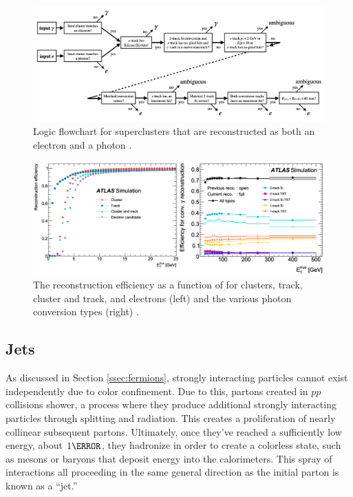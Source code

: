 \begin{figure}[h]
    \centering
    \includegraphics[width=1\textwidth]{chapters/chapter3_eventreco/images/egamma-amb.png}

    \caption[Logic flowchart for superclusters that are reconstructed as both an electron and a photon]{Logic flowchart for superclusters that are reconstructed as both an electron and a photon \cite{photon-electron-perf}.}
    \label{fig:ambiguity-logic}
\end{figure}



\begin{figure}[h]
    \centering
    \includegraphics[width=1\textwidth]{chapters/chapter3_eventreco/images/combined-efficiency.png}

    \caption[The reconstruction efficiency as a function of \et for electrons and converted photons]{The reconstruction efficiency as a function of \et for clusters, track, cluster and track, and electrons (left) and the various photon conversion types (right) \cite{photon-electron-perf}.}
    \label{fig:reco-eff}
\end{figure}


\subsection{Jets} \label{ssec:jet-reco}
As discussed in Section \ref{ssec:fermions}, strongly interacting particles cannot exist independently due to color confinement. Due to this, partons created in $pp$ collisions shower, a process where they produce additional strongly interacting particles through splitting and radiation. This creates a proliferation of nearly collinear subsequent partons. Ultimately, once they've reached a sufficiently low energy, about $\unit{1}{\GeV}$, they hadronize in order to create a colorless state, such as mesons or baryons that deposit energy into the calorimeters. This spray of interactions all proceeding in the same general direction as the initial parton is known as a ``jet.''

